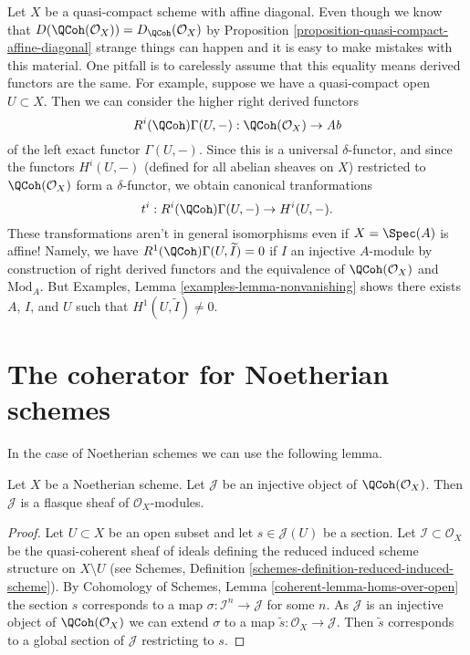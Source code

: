 \begin{remark}[Warning]
\label{remark-warning-coherator}
Let $X$ be a quasi-compact scheme with affine diagonal. Even though we know
that $D(\QCoh(\mathcal{O}_X)) = D_\QCoh(\mathcal{O}_X)$ by
Proposition \ref{proposition-quasi-compact-affine-diagonal}
strange things can
happen and it is easy to make mistakes with this material. One pitfall
is to carelessly assume that this equality means derived functors are the same.
For example, suppose we have a quasi-compact open $U \subset X$. Then we can
consider the higher right derived functors
$$
R^i(\QCoh)\Gamma(U, -) : \QCoh(\mathcal{O}_X) \to \textit{Ab}
$$
of the left exact functor $\Gamma(U, -)$. Since this is a universal
$\delta$-functor, and since the functors $H^i(U, -)$ (defined for all
abelian sheaves on $X$) restricted to $\QCoh(\mathcal{O}_X)$ form
a $\delta$-functor, we obtain canonical tranformations
$$
t^i : R^i(\QCoh)\Gamma(U, -) \to H^i(U, -).
$$
These transformations aren't in general isomorphisms even if $X = \Spec(A)$
is affine! Namely, we have $R^1(\QCoh)\Gamma(U, \widetilde{I}) = 0$
if $I$ an injective $A$-module by construction of right derived functors
and the equivalence of $\QCoh(\mathcal{O}_X)$ and $\text{Mod}_A$.
But Examples, Lemma \ref{examples-lemma-nonvanishing}
shows there exists $A$, $I$, and $U$ such that
$H^1(U, \widetilde{I}) \not = 0$.
\end{remark}




\section{The coherator for Noetherian schemes}
\label{section-coherator-Noetherian}

\noindent
In the case of Noetherian schemes we can use the following lemma.

\begin{lemma}
\label{lemma-injective-quasi-coherent-sheaf-Noetherian}
Let $X$ be a Noetherian scheme. Let $\mathcal{J}$ be an injective
object of $\QCoh(\mathcal{O}_X)$. Then $\mathcal{J}$
is a flasque sheaf of $\mathcal{O}_X$-modules.
\end{lemma}

\begin{proof}
Let $U \subset X$ be an open subset and let $s \in \mathcal{J}(U)$ be a section.
Let $\mathcal{I} \subset \mathcal{O}_X$ be the quasi-coherent sheaf
of ideals defining the reduced induced scheme structure on $X \setminus U$
(see Schemes, Definition \ref{schemes-definition-reduced-induced-scheme}).
By Cohomology of Schemes, Lemma \ref{coherent-lemma-homs-over-open}
the section $s$ corresponds to a map $\sigma : \mathcal{I}^n \to \mathcal{J}$
for some $n$. As $\mathcal{J}$ is an injective object of
$\QCoh(\mathcal{O}_X)$ we can extend $\sigma$ to a map
$\tilde s : \mathcal{O}_X \to \mathcal{J}$. Then $\tilde s$ corresponds
to a global section of $\mathcal{J}$ restricting to $s$.
\end{proof}

